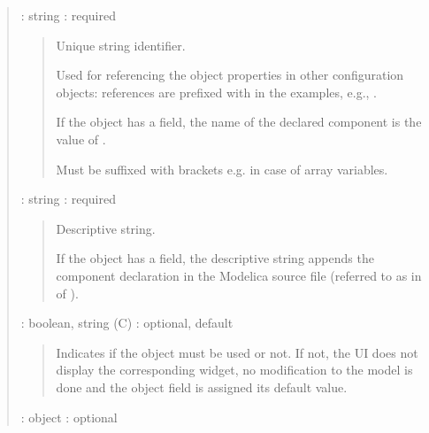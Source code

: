 \documentclass[letterpaper,10pt, openany,english]{sphinxmanual}
\begin{document}
\label{\detokenize{requirements:elementary-object}}
\begin{quote}

 : string : required
\begin{quote}

\begin{DUlineblock}{0em}
\item[] Unique string identifier.
\item[] Used for referencing the object properties in other configuration objects: references are prefixed with \sphinxcode{\sphinxupquote{\#}} in the examples, e.g., .
\item[] If the object has a  field, the name of the declared component is the value of .
\item[] Must be suffixed with brackets e.g. \sphinxcode{\sphinxupquote{{[}2{]}}} in case of array variables.
\end{DUlineblock}
\end{quote}

 : string : required
\begin{quote}

\begin{DUlineblock}{0em}
\item[] Descriptive string.
\item[] If the object has a  field, the descriptive string appends the component declaration in the Modelica source file (referred to as  in  of ).
\end{DUlineblock}
\end{quote}

 : boolean, string (C) : optional, default 
\begin{quote}

Indicates if the object must be used or not. If not, the UI does not display the corresponding widget, no modification to the model is done and the object field  is assigned its default value.
\end{quote}

 : object : optional
\begin{quote}


\end{quote}
\end{quote}
\end{document}
